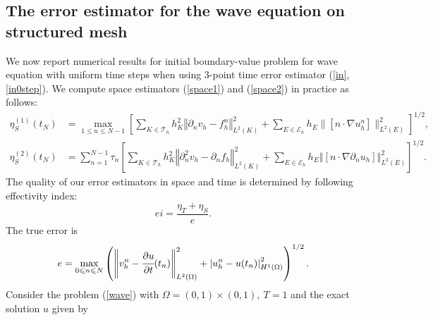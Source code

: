 \documentclass{imanum}
\begin{document}
\subsection{The error estimator for the wave equation on structured mesh}
We now report numerical results for initial boundary-value problem for wave equation with uniform time steps when using 3-point time error estimator (\ref{in}, \ref{in0step}). We compute space estimators (\ref{space1}) and (\ref{space2}) in practice as follows:
\begin{align}
 \label{etas1} \eta_S^{(1)} (t_N) &= \max_{1 \leq n \leq N-1} \left[ \sum_{K \in \mathcal{T}_h}
   h_K^2  \left\Vert  \partial_n v_h-{f}^n_{h}
   \right\Vert_{L^2(K)}^2\right. +\left.\sum_{
E \in \mathcal{E}_h}h_{E} \|[n \cdot \nabla {u}^n_{h}]\|_{L^2(E)}^2 \right]^{1/2},
\\
\label{etas2}  \eta_S^{(2)} (t_N)  &= \sum_{n = 1}^{N-1} \tau_n \left[ \sum_{K \in \mathcal{T}_h} h_K^2
  \left\Vert  \partial_n^2 v_h - \partial_n f_h\right\Vert_{L^2(K)}^2 + \sum_{
E \in \mathcal{E}_h}h_{E} \left\Vert\left[n \cdot
  \nabla  \partial_n u_h\right]\right\Vert_{L^2(E)}^2
  \right]^{1/2}.
\end{align}
The quality of our error estimators in space and time is determined by following effectivity index:
\begin{equation*}
ei=\frac{\eta_T+\eta_S}{e}.
\end{equation*}
The true error is
\begin{equation*}
e=\max_{0 \leqslant n \leqslant N}\left(\left\Vert v^{n}_h-\cfrac{\partial u}{\partial t}(t_{n})\right\Vert_{L^2(\Omega)} ^{2}+\left\vert u^{n}_h-u(t_{n})\right\vert^{2}_{H^1(\Omega)}\right) ^{{1}/{2}}.
\end{equation*}
Consider the problem (\ref{wave}) with $\Omega=(0,1)\times(0,1),~ T=1$ and the exact solution $u$ given by
\end{document}
